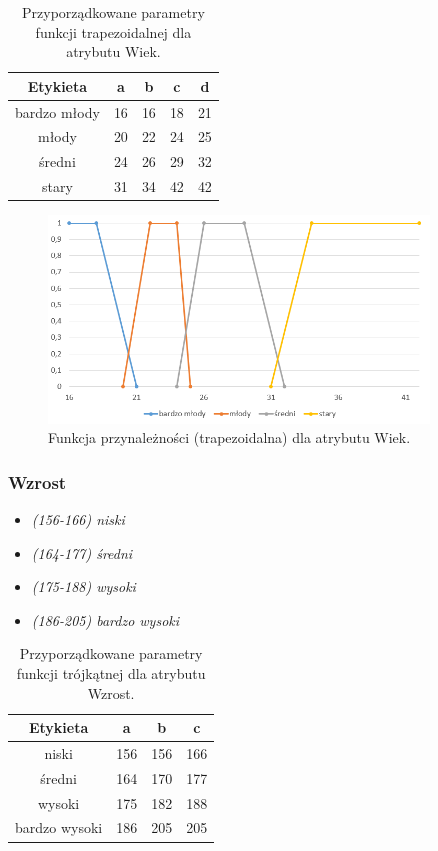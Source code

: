 \documentclass{classrep}
\begin{document}
	\begin{table}[h!]
		\centering
		\begin{tabular} {c c c c c}
			\hline
			\textbf{Etykieta} & \textbf{a} & \textbf{b} & \textbf{c} & \textbf{d} \\ [0.5ex] 
			\hline	
			\hline 
			bardzo młody & 16 & 16 & 18 & 21  \\
			młody & 20 & 22 & 24 & 25  \\
			średni & 24 & 26 & 29 & 32  \\
			stary & 31 & 34 & 42 & 42  \\
			\hline
		\end{tabular}
		\caption{Przyporządkowane parametry funkcji trapezoidalnej dla atrybutu  Wiek. }
		\label{tabelaWiek}
	\end{table}

	\begin{figure}[h!]
		\centering
		\includegraphics[width=0.9\textwidth]{zmienne/1.png}
		\caption{Funkcja przynależności (trapezoidalna) dla atrybutu Wiek.}
		\label{wykresWiek}
	\end{figure}
	
	\newpage
	\subsubsection{Wzrost}
	\begin{itemize}
		\item \textsl{(156-166) niski}
		\item \textsl{(164-177) średni}
		\item \textsl{(175-188) wysoki}
		\item \textsl{(186-205) bardzo wysoki}
	\end{itemize}
	
	\begin{table}[h!]
		\centering
		\begin{tabular} {c c c c}
			\hline
			\textbf{Etykieta} & \textbf{a} & \textbf{b} & \textbf{c} \\ [0.5ex] 
			\hline	
			\hline 
			niski & 156 & 156 & 166 \\
			średni & 164 & 170 & 177 \\
			wysoki & 175 & 182 & 188 \\
			bardzo wysoki & 186 & 205 & 205  \\
			\hline
		\end{tabular}
		\caption{Przyporządkowane parametry funkcji trójkątnej dla atrybutu Wzrost. }
		\label{tabelaWzrost}
	\end{table}
	
\end{document}
